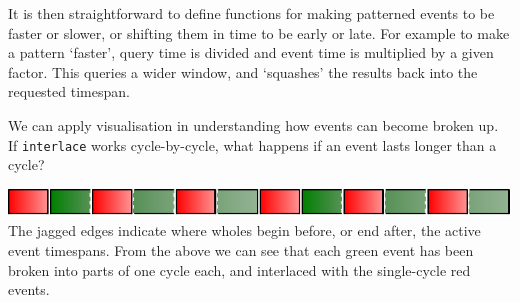 It is then straightforward to define functions for making patterned
events to be faster or slower, or shifting them in time to be early or
late. For example to make a pattern `faster', query time is divided and
event time is multiplied by a given factor. This queries a wider window,
and `squashes' the results back into the requested timespan.

\begin{Shaded}
\begin{Highlighting}[]
  \OtherTok{{-}\textgreater{}} \OtherTok{{-}\textgreater{}} 
\OtherTok{=}\OperatorTok{/}\OperatorTok{*}
\OtherTok{=}\OperatorTok{*}\OperatorTok{/}
\OtherTok{=}\OperatorTok{+}
\OtherTok{=}\OperatorTok{+}
\end{Highlighting}
\end{Shaded}

We can apply visualisation in understanding how events can become broken
up. If \texttt{interlace} works cycle-by-cycle, what happens if an event
lasts longer than a cycle?

\begin{Shaded}
\begin{Highlighting}[]
\OtherTok{=}\NormalTok{ interlace [atom red, \_slow } \OperatorTok{$}\NormalTok{ atom green]}
\end{Highlighting}
\end{Shaded}

\includegraphics{../figures/fig4.pdf}\\

The jagged edges indicate where wholes begin before, or end after, the
active event timespans. From the above we can see that each green event
has been broken into parts of one cycle each, and interlaced with the
single-cycle red events.

